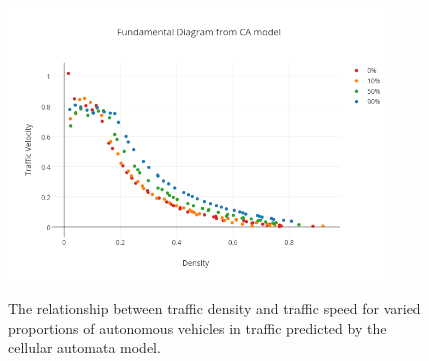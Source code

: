 \begin{figure}[h]
\centering
\includegraphics[width=0.9\textwidth]{img/velocity-plot.png}\\
\caption{The relationship between traffic density and traffic speed for varied proportions of autonomous vehicles in traffic predicted by the cellular automata model.}
\label{fig:vel-plot}
\end{figure}